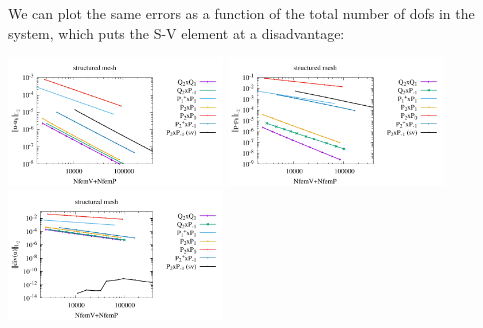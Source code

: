 We can plot the same errors as a function of the total number of dofs in the system, 
which puts the S-V element at a disadvantage:
\begin{center}
\includegraphics[width=5.7cm]{python_codes/fieldstone_120/paperresults/plin_structured_errorsV2.pdf}
\includegraphics[width=5.7cm]{python_codes/fieldstone_120/paperresults/plin_structured_errorsP2.pdf}
\includegraphics[width=5.7cm]{python_codes/fieldstone_120/paperresults/plin_structured_errors_divv2.pdf}\\
\end{center}

